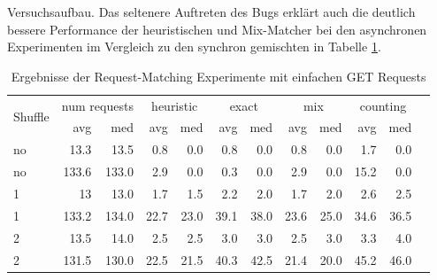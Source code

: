 \documentclass[12pt,a4paper]{report}
\begin{document}
Versuchsaufbau. Das seltenere Auftreten des Bugs erklärt auch die deutlich bessere Performance der heuristischen und Mix-Matcher
bei den asynchronen Experimenten im Vergleich zu den synchron gemischten in Tabelle \ref{tab:get}.
\begin{table}[H]
	\centering
	\caption{Ergebnisse der Request-Matching Experimente mit einfachen GET Requests}
	\label{tab:get}
	\begin{tabular}{|l|r|r|r|r|r|r|r|r|r|r|r|}
		\hline
		\multirow{2}{*}{Shuffle} & \multicolumn{2}{|c|}{num requests} & \multicolumn{2}{|c|}{heuristic} & \multicolumn{2}{|c|}{exact} & \multicolumn{2}{|c|}{mix} & \multicolumn{2}{|c|}{counting}                                    \\ \cline{2-11}
		                         & avg                                & med                             & avg                         & med                       & avg                            & med  & avg  & med  & avg  & med  \\ \hline
		no                       & 13.3                               & 13.5                            & 0.8                         & 0.0                       & 0.8                            & 0.0  & 0.8  & 0.0  & 1.7  & 0.0  \\ \hline
		no                       & 133.6                              & 133.0                           & 2.9                         & 0.0                       & 0.3                            & 0.0  & 2.9  & 0.0  & 15.2 & 0.0  \\ \hline
		1                        & 13                                 & 13.0                            & 1.7                         & 1.5                       & 2.2                            & 2.0  & 1.7  & 2.0  & 2.6  & 2.5  \\ \hline
		1                        & 133.2                              & 134.0                           & 22.7                        & 23.0                      & 39.1                           & 38.0 & 23.6 & 25.0 & 34.6 & 36.5 \\ \hline
		2                        & 13.5                               & 14.0                            & 2.5                         & 2.5                       & 3.0                            & 3.0  & 2.5  & 3.0  & 3.3  & 4.0  \\ \hline
		2                        & 131.5                              & 130.0                           & 22.5                        & 21.5                      & 40.3                           & 42.5 & 21.4 & 20.0 & 45.2 & 46.0 \\ \hline

\end{tabular}
\end{table}
\end{document}
